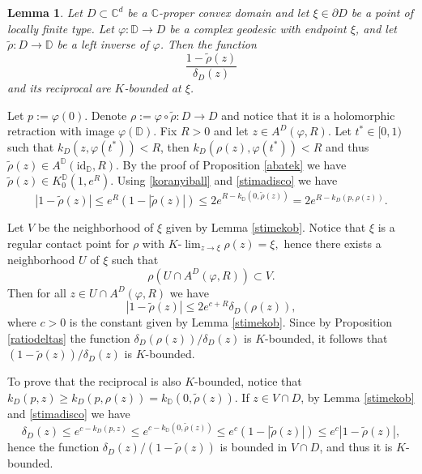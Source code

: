 \documentclass[11pt, reqno]{amsart}
\numberwithin{equation}{section}
\newtheorem{lemma}[theorem]{Lemma}
\theoremstyle{definition}
\newcommand{\C}{\mathbb{C}}
\newcommand{\D}{\mathbb{D}}
\newcommand{\id}{\mathrm{id}}
\begin{document}
{{{\begin{lemma}
			Let $D\subset\C^d$ be a $\C$-proper convex domain and let $\xi\in\partial D$ be a point of locally finite type.
			Let $\varphi\colon \D\to D$ be a complex geodesic with endpoint $\xi$, and let $\tilde \rho\colon D\to \D$ be a left inverse of $\varphi$. 
			Then the function
			$$\frac{1-\tilde{\rho}(z)}{\delta_D(z)}$$
			and its reciprocal are $K$-bounded at $\xi$.
			
		\end{lemma}
		
		\proof Let $p:=\varphi(0)$. Denote  $\rho:=\varphi\circ\tilde \rho\colon D\to D$ and notice that it is a holomorphic retraction with image $\varphi(\D)$.  Fix $R>0$ and let $z\in A^D(\varphi,R)$. Let $t^*\in[0,1)$ such that $k_D(z,\varphi(t^*))<R$, then $k_D(\rho(z),\varphi(t^*))<R$ and thus $\tilde{\rho}(z)\in A^\D(\id_\D,R)$. By the proof of Proposition \ref{abatek} we have $\tilde{\rho}(z)\in K_0^\D(1,e^R)$. 
		Using \eqref{koranyiball}  and \eqref{stimadisco} we have
		$$|1-\tilde{\rho}(z)|\leq e^R(1-|\tilde{\rho}(z)|)\leq 2e^{R-k_\D(0,\tilde{\rho}(z))}=2e^{R-k_D(p,\rho(z))}.$$
		
		Let $V$ be the neighborhood of $\xi$ given by Lemma  \ref{stimekob}.
		Notice that $\xi$ is a regular contact point for $\rho$ with
		$ K\textrm{-}\lim_{z\to\xi} \rho(z)=\xi,$
		hence there exists a neighborhood  $U$  of $\xi$ such that $$\rho(U\cap A^D(\varphi,R))\subset V.$$
		Then for all $z\in U\cap A^D(\varphi,R)$ we have 
		$$|1-\tilde{\rho}(z)|\leq 2e^{c+R}\delta_D(\rho(z)),$$
		where $c>0$ is the constant given by  Lemma  \ref{stimekob}. Since  by Proposition \ref{ratiodeltas} the function $\delta_D(\rho(z))/\delta_D(z)$ is $K$-bounded, it follows that  $(1-\tilde{\rho}(z))\slash\delta_D(z)$ is $K$-bounded.
		
		To prove that the reciprocal is also $K$-bounded, notice that   $k_D(p,z)\geq k_D(p,\rho(z))=k_\D(0,\tilde{\rho}(z))$.  If $z\in V\cap D$,   by Lemma \ref{stimekob} and \eqref{stimadisco} we have
		$$\delta_D(z)\leq e^{c-k_D(p,z)}\leq e^{c-k_\D(0,\tilde{\rho}(z))}\leq e^c(1-|\tilde{\rho}(z)|)\leq e^c |1-\tilde{\rho}(z)|,$$
		hence the function $\delta_D(z)/(1-\tilde{\rho}(z))$ is bounded in $V\cap D$, and thus it is $K$-bounded.
		\endproof
		
		
		
}}}
\end{document}
